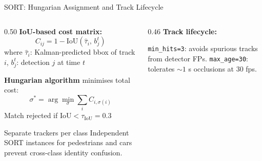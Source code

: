 \documentclass[aspectratio=169]{beamer}
\begin{document}
\begin{frame}{SORT: Hungarian Assignment and Track Lifecycle}
  \begin{columns}[T]
    \begin{column}{0.50\textwidth}
      \textbf{IoU-based cost matrix:}
      \[
        C_{ij} = 1 - \mathrm{IoU}(\hat{\tau}_i,\, b_j^t)
      \]
      where $\hat{\tau}_i$: Kalman-predicted bbox of track $i$,\;
      $b_j^t$: detection $j$ at time $t$

      \textbf{Hungarian algorithm} minimises total cost:
      \[
        \sigma^* = \arg\min_{\sigma} \sum_i C_{i,\sigma(i)}
      \]
      Match rejected if $\mathrm{IoU} < \tau_\mathrm{IoU} = 0.3$
      \vspace{0.3em}
      \begin{alertblock}{Separate trackers per class}
        \small Independent SORT instances for pedestrians and cars
        prevent cross-class identity confusion.
      \end{alertblock}
    \end{column}
    \begin{column}{0.46\textwidth}
      \textbf{Track lifecycle:}
      \vspace{0.2em}

      \vspace{0.2em}
      \begin{block}{}
        \scriptsize \texttt{min\_hits=3}: avoids spurious tracks from
        detector FPs.\quad
        \texttt{max\_age=30}: tolerates ${\sim}1$ s occlusions at 30 fps.
      \end{block}
    \end{column}
  \end{columns}
\end{frame}
\end{document}
